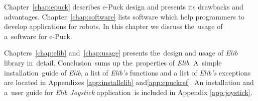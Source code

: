   Chapter~\ref{chap:epuck} describes e-Puck design and presents its drawbacks and advantages.
  Chapter~\ref{chap:software} lists software which help programmers to develop applications for robots.
  In this chapter we discuss the~usage of a~software for e-Puck. 
  
  Chapters~\ref{chap:elib} and~\ref{chap:usage} presents the~design and usage of {\it Elib} library in~detail.
  Conclusion~sums up the~properties of {\it Elib}.
  A~simple installation~guide of {\it Elib}, a list of {\it Elib's} functions and a list of {\it Elib's} exceptions  are located in Appendixes \ref{app:installelib} and\ref{app:epuckref}.
  An installation and a~user guide for {\it Elib Joystick} application~is included in Appendix \ref{app:joystick}. 



